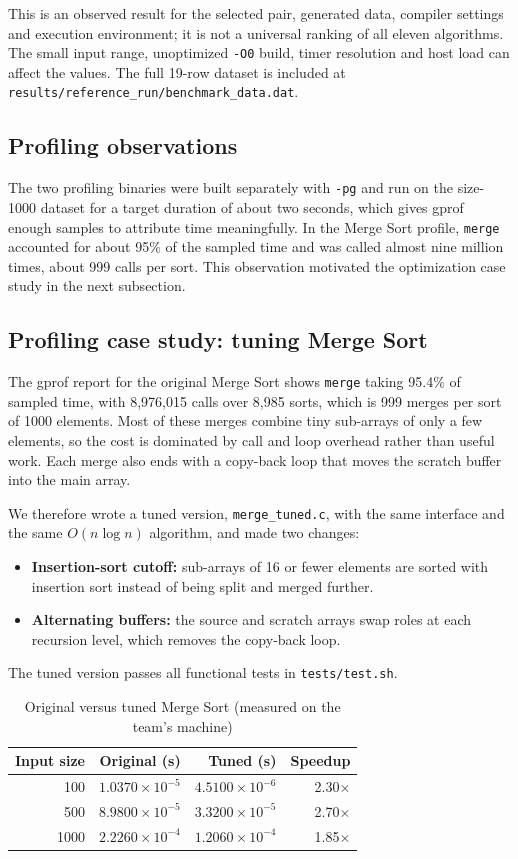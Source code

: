 \documentclass[12pt,a4paper,oneside]{report}
\begin{document}
This is an observed result for the selected pair, generated data, compiler settings and execution environment; it is not a universal ranking of all eleven algorithms. The small input range, unoptimized \texttt{-O0} build, timer resolution and host load can affect the values. The full 19-row dataset is included at \texttt{results/reference\_run/benchmark\_data.dat}.

\subsection{Profiling observations}
The two profiling binaries were built separately with \texttt{-pg} and run on the size-1000 dataset for a target duration of about two seconds, which gives gprof enough samples to attribute time meaningfully. In the Merge Sort profile, \texttt{merge} accounted for about 95\% of the sampled time and was called almost nine million times, about 999 calls per sort. This observation motivated the optimization case study in the next subsection.

\subsection{Profiling case study: tuning Merge Sort}
The gprof report for the original Merge Sort shows \texttt{merge} taking 95.4\% of sampled time, with 8{,}976{,}015 calls over 8{,}985 sorts, which is 999 merges per sort of 1000 elements. Most of these merges combine tiny sub-arrays of only a few elements, so the cost is dominated by call and loop overhead rather than useful work. Each merge also ends with a copy-back loop that moves the scratch buffer into the main array.

We therefore wrote a tuned version, \texttt{merge\_tuned.c}, with the same interface and the same $O(n\log n)$ algorithm, and made two changes:
\begin{itemize}[leftmargin=*]
\item \textbf{Insertion-sort cutoff:} sub-arrays of 16 or fewer elements are sorted with insertion sort instead of being split and merged further.
\item \textbf{Alternating buffers:} the source and scratch arrays swap roles at each recursion level, which removes the copy-back loop.
\end{itemize}
The tuned version passes all functional tests in \texttt{tests/test.sh}.

\begin{table}[H]\centering
\caption{Original versus tuned Merge Sort (measured on the team's machine)}
\begin{tabular}{rrrr}
\toprule
\textbf{Input size} & \textbf{Original (s)} & \textbf{Tuned (s)} & \textbf{Speedup}\\
\midrule
100 & $1.0370\times10^{-5}$ & $4.5100\times10^{-6}$ & 2.30$\times$\\
500 & $8.9800\times10^{-5}$ & $3.3200\times10^{-5}$ & 2.70$\times$\\
1000 & $2.2260\times10^{-4}$ & $1.2060\times10^{-4}$ & 1.85$\times$\\
\bottomrule
\end{tabular}
\end{table}
\end{document}
